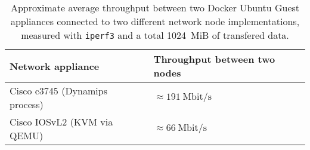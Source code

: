 \begin{table}
  \centering
  \small
  \begin{tabulary}{0.9\textwidth}{ll}
    \toprule
      \textbf{Network appliance}     & \textbf{Throughput between two nodes}\\
    \midrule
      Cisco c3745 (Dynamips process) & $\approx 191~\mbox{Mbit/s}$\\
      Cisco IOSvL2 (KVM via QEMU)    & $\approx 66~\mbox{Mbit/s}$\\
    \bottomrule
  \end{tabulary}
  \caption{%
    Approximate average throughput between two Docker Ubuntu Guest appliances connected to two different network node implementations, measured with \texttt{iperf3} and a total 1024~MiB of transfered data.
  }
  \label{tab:gns3-iperf}
\end{table}
